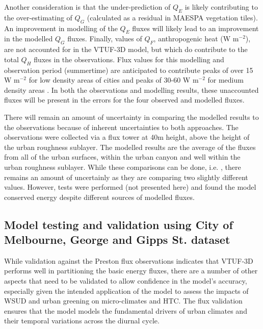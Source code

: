 \documentclass[final,3p,times,authoryear]{elsarticle}
\begin{document}
Another consideration is that the under-prediction of $Q_{E}$ is likely contributing to the over-estimating of $Q_{G}$ (calculated as a residual in MAESPA vegetation tiles). An improvement in modelling of the $Q_{E}$ fluxes will likely lead to an improvement in the modelled $Q_{G}$ fluxes. Finally, values of $Q_{F}$, anthropogenic heat (W m$^{-2}$), are not accounted for in the VTUF-3D model, but which do contribute to the total $Q_{H}$ fluxes in the observations. Flux values for this modelling and observation period (summertime) are anticipated to contribute peaks of over 15 W m$^{-2}$ for low density areas of cities and peaks of 30-60 W m$^{-2}$ for medium density areas \citep{Sailor2004}. In both the observations and modelling results, these unaccounted fluxes will be present in the errors for the four observed and modelled fluxes. 



There will remain an amount of uncertainty in comparing the modelled results to the observations because of inherent uncertainties to both approaches. The observations were collected via a flux tower at 40m height, above the height of the urban roughness sublayer. The modelled results are the average of the fluxes from all of the urban surfaces, within the urban canyon and well within the urban roughness sublayer. While these comparisons can be done, i.e. \cite{Grimmond2011}, there remains an amount of uncertainly as they are comparing two slightly different values. However, tests were performed (not presented here) and found the model conserved energy despite different sources of modelled fluxes.



\subsection{Model testing and validation using City of Melbourne, George and Gipps St. dataset}\label{sec:CoMValidations}

While validation against the Preston flux observations indicates that VTUF-3D performs well in partitioning the basic energy fluxes, there are a number of other aspects that need to be validated to allow confidence in the model's accuracy, especially given the intended application of the model to assess the impacts of WSUD and urban greening on micro-climates and HTC. The flux validation ensures that the model models the fundamental drivers of urban climates and their temporal variations across the diurnal cycle. 
\end{document}

